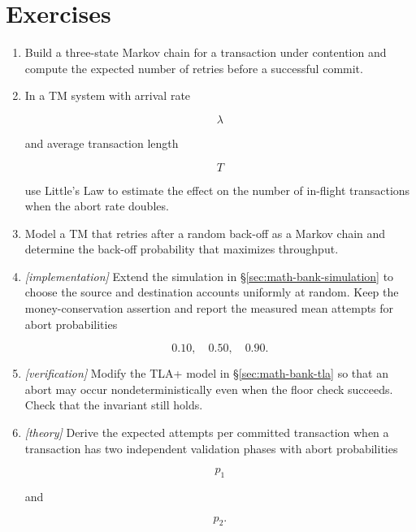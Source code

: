\section{Exercises}
\begin{enumerate}
    \item Build a three-state Markov chain for a transaction under contention and compute the expected number of retries before a successful commit.
    \item In a TM system with arrival rate

$$
\lambda
$$

and average transaction length

$$
T
$$

use Little's Law to estimate the effect on the number of in-flight transactions when the abort rate doubles.

    \item Model a TM that retries after a random back-off as a Markov chain and determine the back-off probability that maximizes throughput.
    \item \emph{[implementation]} Extend the simulation in \S\ref{sec:math-bank-simulation} to choose the source and destination accounts uniformly at random. Keep the money-conservation assertion and report the measured mean attempts for abort probabilities

$$
0.10,\quad 0.50,\quad 0.90.
$$

    \item \emph{[verification]} Modify the TLA+ model in \S\ref{sec:math-bank-tla} so that an abort may occur nondeterministically even when the floor check succeeds. Check that the invariant still holds.
    \item \emph{[theory]} Derive the expected attempts per committed transaction when a transaction has two independent validation phases with abort probabilities

$$
p_1
$$

and

$$
p_2.
$$


\end{enumerate}
